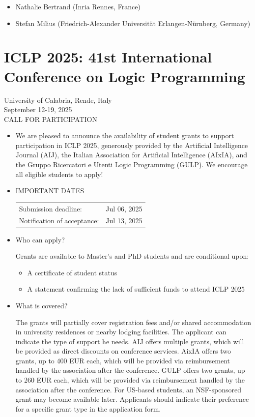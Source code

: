 \documentclass[prodmode,acmtecs]{acmsmall} %
\begin{document}
{\begin{itemize}
\begin{itemize}\item  Nathalie Bertrand (Inria Rennes, France)
\item  Stefan Milius (Friedrich-Alexander Universität Erlangen-Nürnberg, Germany)
\end{itemize} 
\end{itemize}\section{ICLP 2025: 41st International Conference on Logic Programming }\label{ICLP2025}  University of Calabria, Rende, Italy\\ 
  September 12-19, 2025\\ 
CALL FOR PARTICIPATION 

\begin{itemize}\item  We are pleased to announce the availability of student grants to support participation in ICLP 2025, generously provided by the Artificial Intelligence Journal (AIJ), the Italian Association for Artificial Intelligence (AIxIA), and the Gruppo Ricercatori e Utenti Logic Programming (GULP). We encourage all eligible students to apply! 
 
\item  IMPORTANT DATES 
 
\begin{tabulary}{\linewidth}{LL}Submission deadline:  & Jul 06, 2025 \\
Notification of acceptance:  & Jul 13, 2025 \\
\end{tabulary}
 
\item  Who can apply? 
 
  Grants are available to Master’s and PhD students and are conditional upon: 
 
\begin{itemize}\item  A certificate of student status
\item  A statement confirming the lack of sufficient funds to attend ICLP 2025
\end{itemize} 
\item  What is covered? 
 
  The grants will partially cover registration fees and/or shared accommodation in university residences or nearby lodging facilities. The applicant can indicate the type of support he needs. AIJ offers multiple grants, which will be provided as direct discounts on conference services. AixIA offers two grants, up to 400 EUR each, which will be provided via reimbursement handled by the association after the conference.  GULP offers two grants, up to 260 EUR each, which will be provided via reimbursement handled by the association after the conference. For US-based students, an NSF-sponsored grant may become available later. Applicants should indicate their preference for a specific grant type in the application form. 
 

\end{itemize}}
\end{document}
